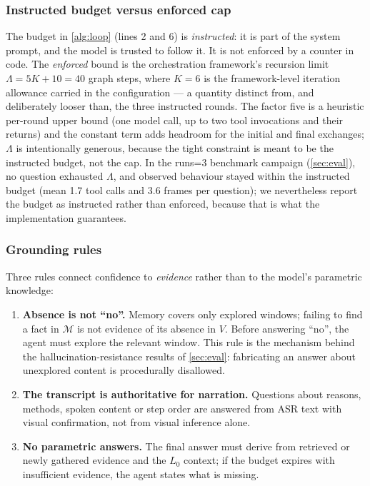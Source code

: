\subsubsection{Instructed budget versus enforced cap}
\label{subsubsec:budget}

The budget in \cref{alg:loop} (lines 2 and 6) is \emph{instructed}: it is part of the system prompt, and
the model is trusted to follow it. It is not enforced by a counter in code. The \emph{enforced}
bound is the orchestration framework's recursion limit $\Lambda = 5K + 10 = 40$ graph steps,
where $K = 6$ is the framework-level iteration allowance carried in the configuration --- a
quantity distinct from, and deliberately looser than, the three instructed rounds. The factor
five is a heuristic per-round upper bound (one model call, up to two tool invocations and their
returns) and the constant term adds headroom for the initial and final exchanges; $\Lambda$ is
intentionally generous, because the tight constraint is meant to be the instructed budget, not
the cap. In the runs=3 benchmark campaign (\cref{sec:eval}), no question exhausted
$\Lambda$, and observed behaviour stayed within the instructed budget (mean 1.7 tool calls and
3.6 frames per question); we nevertheless report the budget as instructed rather than enforced,
because that is what the implementation guarantees.

\subsubsection{Grounding rules}
\label{subsubsec:grounding}

Three rules connect confidence to \emph{evidence} rather than to the model's parametric knowledge:

\begin{enumerate}
  \item \textbf{Absence is not ``no''.} Memory covers only explored windows; failing to find a fact in
  $\mathcal{M}$ is not evidence of its absence in $V$. Before answering ``no'', the agent must
  explore the relevant window. This rule is the mechanism behind the hallucination-resistance
  results of \cref{sec:eval}: fabricating an answer about unexplored content is procedurally disallowed.
  \item \textbf{The transcript is authoritative for narration.} Questions about reasons, methods, spoken
  content or step order are answered from ASR text with visual confirmation, not from visual
  inference alone.
  \item \textbf{No parametric answers.} The final answer must derive from retrieved or newly gathered
  evidence and the $L_0$ context; if the budget expires with insufficient evidence, the agent
  states what is missing.
\end{enumerate}

